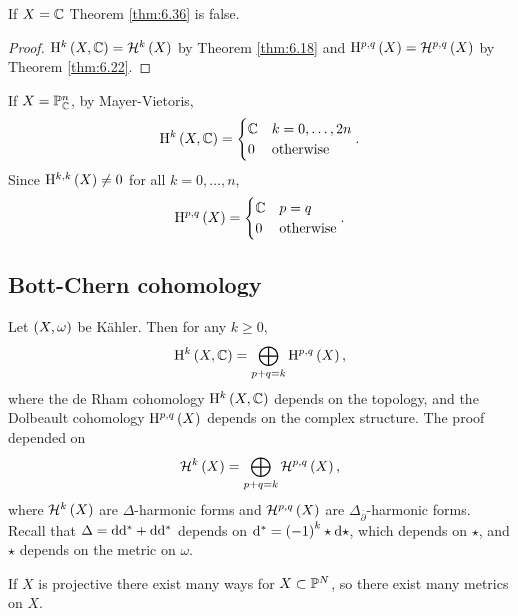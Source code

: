 \begin{exercise*}
If $ X = \mathbb{C} $ Theorem \ref{thm:6.36} is false.
\end{exercise*}

\begin{proof}
$ \H^k\br{X, \CC} = \HHH^k\br{X} $ by Theorem \ref{thm:6.18} and $ \H^{p, q}\br{X} = \HHH^{p, q}\br{X} $ by Theorem \ref{thm:6.22}.
\end{proof}

\begin{example}
If $ X = \mathbb{P}_{\mathbb{C}}^n $, by Mayer-Vietoris,
$$ \H^k\br{X, \CC} =
\begin{cases}
\CC & k = 0, \dots, 2n \\
0 & \text{otherwise}
\end{cases}.
$$
Since $ \H^{k, k}\br{X} \ne 0 $ for all $ k = 0, \dots, n $,
$$ \H^{p, q}\br{X} =
\begin{cases}
\CC & p = q \\
0 & \text{otherwise}
\end{cases}.
$$
\end{example}

\subsection{Bott-Chern cohomology}


Let $ \br{X, \omega} $ be K\"ahler. Then for any $ k \ge 0 $,
$$ \H^k\br{X, \CC} = \bigoplus_{p + q = k} \H^{p, q}\br{X}, $$
where the de Rham cohomology $ \H^k\br{X, \CC} $ depends on the topology, and the Dolbeault cohomology $ \H^{p, q}\br{X} $ depends on the complex structure. The proof depended on
$$ \HHH^k\br{X} = \bigoplus_{p + q = k} \HHH^{p, q}\br{X}, $$
where $ \HHH^k\br{X} $ are $ \Delta $-harmonic forms and $ \HHH^{p, q}\br{X} $ are $ \Delta_{\overline{\partial}} $-harmonic forms. Recall that $ \Delta = \mathrm{d}\mathrm{d}^* + \mathrm{d}\mathrm{d}^* $ depends on $ \d^* = \br{-1}^k\star\d\star $, which depends on $ \star $, and $ \star $ depends on the metric on $ \omega $.

\begin{example*}
If $ X $ is projective there exist many ways for $ X \subset \mathbb{P}^N $, so there exist many metrics on $ X $.
\end{example*}

